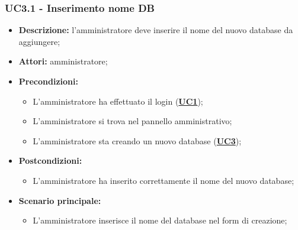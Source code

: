 \subsubsection{UC3.1 - Inserimento nome DB}
\label{sec:UC3.1}
\begin{itemize}
	\item \textbf{Descrizione:} l’amministratore deve inserire il nome del nuovo database da aggiungere;
	\item \textbf{Attori:} amministratore;
	\item \textbf{Precondizioni:} 
	\begin{itemize}
		\item L’amministratore ha effettuato il login (\hyperref[sec:UC1]{\textbf{UC1}});
		\item L’amministratore si trova nel pannello amministrativo;
		\item L’amministratore sta creando un nuovo database (\hyperref[sec:UC3]{\textbf{UC3}});
	\end{itemize}
	\item \textbf{Postcondizioni:} 
	\begin{itemize}
		\item L'amministratore ha inserito correttamente il nome del nuovo database;
	\end{itemize}
	\item \textbf{Scenario principale:} 
	\begin{itemize}
		\item L’amministratore inserisce il nome del database nel form di creazione;
	\end{itemize}
\end{itemize}

